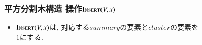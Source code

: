 \documentclass[main]{subfiles}
\begin{document}
\begin{frame}\frametitle{平方分割木構造 操作$\mathrm{\text{I\textsc{nsert}}}(V,x)$}
\begin{itemize}
\item $\mathrm{\text{I\textsc{nsert}}}(V,x)$は, 対応する$summary$の要素と$cluster$の要素を\\ $1$にする.
\end{itemize}
 

\end{frame}
\end{document}
